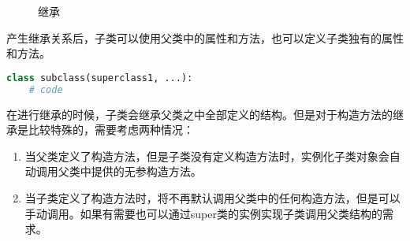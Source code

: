 \begin{figure}[H]
	\centering
	\caption{继承}
\end{figure}

产生继承关系后，子类可以使用父类中的属性和方法，也可以定义子类独有的属性和方法。

\vspace{-0.5cm}

\begin{lstlisting}[language=Python]
class subclass(superclass1, ...):
    # code
\end{lstlisting}

在进行继承的时候，子类会继承父类之中全部定义的结构。但是对于构造方法的继承是比较特殊的，需要考虑两种情况：

\begin{enumerate}
	\item 当父类定义了构造方法，但是子类没有定义构造方法时，实例化子类对象会自动调用父类中提供的无参构造方法。

	\item 当子类定义了构造方法时，将不再默认调用父类中的任何构造方法，但是可以手动调用。如果有需要也可以通过super类的实例实现子类调用父类结构的需求。
\end{enumerate}

\vspace{0.5cm}


